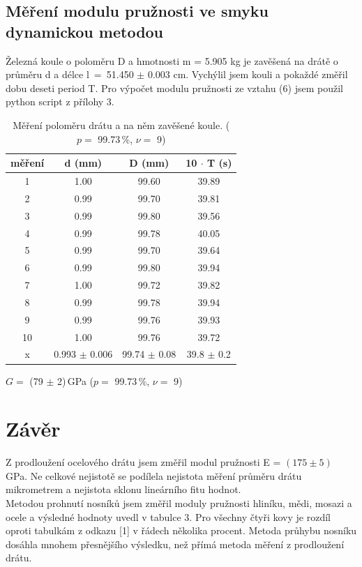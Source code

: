 \documentclass[a4paper,11pt]{article}
\newcommand{\vrn}[6]{\ensuremath{#1 =} (#2 $\pm$ #3)\,#4 ($p=$ #5\,\%, $\nu=$ #6)}
\begin{document}
\subsection{Měření modulu pružnosti ve smyku dynamickou metodou}

Železná koule o poloměru D a hmotnosti m = 5.905 kg je zavěšená na drátě o průměru d a délce  l~=~51.450 $\pm$ 0.003 cm. Vychýlil jsem kouli a pokaždé změřil dobu deseti period T. Pro výpočet modulu pružnosti ze vztahu (6) jsem použil python script z přílohy 3.

\begin{table}[h]
 \centering
 \begin{tabular}{| c | c | c | c |}
    \hline
    měření & d (mm) & D (mm) & 10 $\cdot$ T (s) \\ 
    \hline
    1 & 1.00 & 99.60 & 39.89 \\
    2 & 0.99 & 99.70 & 39.81 \\
    3 & 0.99 & 99.80 & 39.56 \\
    4 & 0.99 & 99.78 & 40.05 \\
    5 & 0.99 & 99.70 & 39.64 \\
    6 & 0.99 & 99.80 & 39.94 \\
    7 & 1.00 & 99.72 & 39.82 \\
    8 & 0.99 & 99.78 & 39.94 \\
    9 & 0.99 & 99.76 & 39.93 \\
    10 & 1.00 & 99.76 & 39.72 \\
    \hline
    x & 0.993 $\pm$ 0.006 & 99.74 $\pm$ 0.08 & 39.8 $\pm$ 0.2 \\
    \hline
 \end{tabular}
 \caption{ Měření poloměru drátu a na něm zavěšené koule. ($p=$ 99.73\,\%, $\nu=$ 9)}
\end{table}

\begin{center}
  \vrn{G}{79}{2}{GPa}{99.73}{9}
\end{center}

\section{Závěr}

Z prodloužení ocelového drátu jsem změřil modul pružnosti E = $(175 \pm 5)$ GPa. Ne celkové nejistotě se podílela nejistota měření průměru drátu mikrometrem a nejistota sklonu lineárního fitu hodnot.  \\

Metodou prohnutí nosníků jsem změřil moduly pružnosti hliníku, mědi, mosazi a ocele a výsledné hodnoty uvedl v tabulce 3. Pro všechny čtyři kovy je rozdíl oproti tabulkám z odkazu [1] v řádech několika procent. Metoda průhybu nosníku dosáhla mnohem přesnějšího výsledku, než přímá metoda měření z prodloužení drátu. \\
\end{document}
